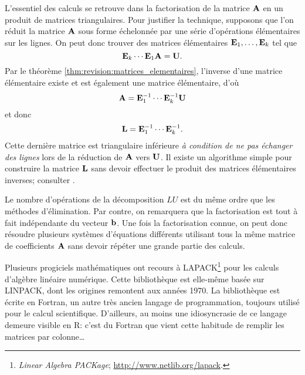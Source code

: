 L'essentiel des calculs se retrouve dans la factorisation de la
matrice $\mathbf{A}$ en un produit de matrices triangulaires. Pour
justifier la technique, supposons que l'on réduit la matrice $\mathbf{A}$
sous forme échelonnée par une série d'opérations élémentaires sur les
lignes. On peut donc trouver des matrices élémentaires $\mathbf{E}_1,
\dots, \mathbf{E}_k$ tel que
\begin{displaymath}
  \mathbf{E}_k \cdots \mathbf{E}_1 \mathbf{A} = \mathbf{U}.
\end{displaymath}
Par le théorème \ref{thm:revision:matrices_elementaires}, l'inverse
d'une matrice élémentaire existe et est également une matrice
élémentaire, d'où
\begin{displaymath}
  \mathbf{A} = \mathbf{E}_1^{-1} \cdots \mathbf{E}_k^{-1} \mathbf{U}
\end{displaymath}
et donc
\begin{displaymath}
  \mathbf{L} = \mathbf{E}_1^{-1} \cdots \mathbf{E}_k^{-1}.
\end{displaymath}
Cette dernière matrice est triangulaire inférieure \emph{à condition
  de ne pas échanger des lignes} lors de la réduction de $\mathbf{A}$
vers $\mathbf{U}$.  Il existe un algorithme simple pour construire la
matrice $\mathbf{L}$ sans devoir effectuer le produit des matrices
élémentaires inverses; consulter \citet[section 9.9]{Anton:linear:8e:2000}.

Le nombre d'opérations de la décomposition $LU$ est du même ordre que
les méthodes d'élimination. Par contre, on remarquera que la
factorisation est tout à fait indépendante du vecteur $\mathbf{b}$. Une
fois la factorisation connue, on peut donc résoudre plusieurs systèmes
d'équations différents utilisant tous la même matrice de coefficients
$\mathbf{A}$ sans devoir répéter une grande partie des calculs.

\begin{rem}
  Plusieurs progiciels mathématiques ont recours à LAPACK\footnote{%
    \emph{Linear Algebra PACKage};
    \url{http://www.netlib.org/lapack}.} %
  pour les calculs d'algèbre linéaire numérique. Cette bibliothèque
  est elle-même basée sur LINPACK, dont les origines remontent aux
  années 1970. La bibliothèque est écrite en Fortran, un autre très
  ancien langage de programmation, toujours utilisé pour le calcul
  scientifique. D'ailleurs, au moins une idiosyncrasie de ce langage
  demeure visible en R: c'est du Fortran que vient cette habitude de
  remplir les matrices par colonne\dots
\end{rem}



